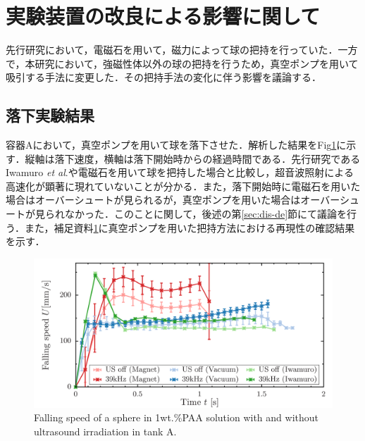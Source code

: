 \section{実験装置の改良による影響に関して}
\label{sec:reexp}

先行研究\cite{ref:8}において，電磁石を用いて，磁力によって球の把持を行っていた．一方で，本研究において，強磁性体以外の球の把持を行うため，真空ポンプを用いて吸引する手法に変更した．その把持手法の変化に伴う影響を議論する．



\subsection{落下実験結果}

容器Aにおいて，真空ポンプを用いて球を落下させた．解析した結果をFig\ref{fig:falling-A}に示す．縦軸は落下速度，横軸は落下開始時からの経過時間である．先行研究であるIwamuro \textit{et al}.\cite{ref:8}や電磁石を用いて球を把持した場合と比較し，超音波照射による高速化が顕著に現れていないことが分かる．また，落下開始時に電磁石を用いた場合はオーバーシュートが見られるが，真空ポンプを用いた場合はオーバーシュートが見られなかった．このことに関して，後述の第\ref{sec:dis-de}節にて議論を行う．また，補足資料\ref{sec:reexp}に真空ポンプを用いた把持方法における再現性の確認結果を示す．

\begin{figure}[ht]
    \centering
    \includegraphics[width=12cm,clip]{./5-Results/s1-A.png}
    \caption{Falling speed of a sphere in 1wt.\%PAA solution with and without ultrasound irradiation in tank A.}
    \label{fig:falling-A}
\end{figure}

